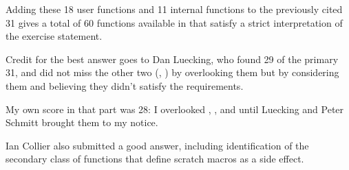 \begin{figure}
\label{tab:internal}
\end{figure}

Adding these 18 user functions and 11 internal functions to the
previously cited 31 gives a total of 60 functions available in
 that satisfy a strict interpretation of the exercise
statement.

Credit for the best answer goes to Dan Luecking, 
who found 29 of the
primary 31, and did not miss the other two (\cmd{\csname}, \cmd{\@if}) by
overlooking them but by considering them and believing they didn't
satisfy the requirements.

My own score in that part was 28: I overlooked \cmd{\read}, \cmd{\alloc@}, and
\cmd{\@if} until Luecking and Peter Schmitt 
brought them to my notice.

Ian Collier also submitted a good answer, including 
identification of
the secondary class of functions that define scratch macros as a side
effect.



